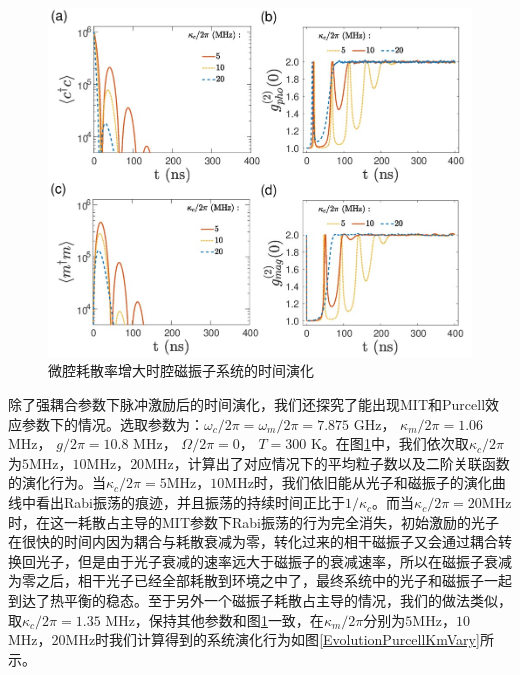 \begin{figure}[htbp]
	\centering
	\includegraphics[width=2\basefigurewidth]{./figure/5_12}
	\caption{微腔耗散率增大时腔磁振子系统的时间演化} 
	\label{EvolutionMITKcVary}
\end{figure}
除了强耦合参数下脉冲激励后的时间演化，我们还探究了能出现MIT和Purcell效应参数下的情况。选取参数为：$\omega_c/2\pi=\omega_m/2\pi=7.875$ GHz， $\kappa_m/2\pi=1.06$ MHz， $g/2\pi=10.8$ MHz， $\Omega/2\pi=0$， $T=300$ K。在图\ref{EvolutionMITKcVary}中，我们依次取$\kappa_c/2\pi$为$5$MHz，$10$MHz，$20$MHz，计算出了对应情况下的平均粒子数以及二阶关联函数的演化行为。当$\kappa_c/2\pi=5$MHz，$10$MHz时，我们依旧能从光子和磁振子的演化曲线中看出Rabi振荡的痕迹，并且振荡的持续时间正比于$1/\kappa_c$。而当$\kappa_c/2\pi=20$MHz时，在这一耗散占主导的MIT参数下Rabi振荡的行为完全消失，初始激励的光子在很快的时间内因为耦合与耗散衰减为零，转化过来的相干磁振子又会通过耦合转换回光子，但是由于光子衰减的速率远大于磁振子的衰减速率，所以在磁振子衰减为零之后，相干光子已经全部耗散到环境之中了，最终系统中的光子和磁振子一起到达了热平衡的稳态。至于另外一个磁振子耗散占主导的情况，我们的做法类似，取$\kappa_c/2\pi=1.35$ MHz，保持其他参数和图\ref{EvolutionMITKcVary}一致，在$\kappa_m/2\pi$分别为$5$MHz，$10$MHz，$20$MHz时我们计算得到的系统演化行为如图\ref{EvolutionPurcellKmVary}所示。
